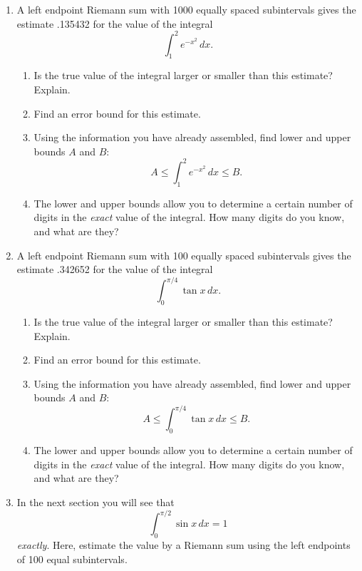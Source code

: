 \begin{enumerate}
\item A left endpoint Riemann sum with 1000 equally spaced subintervals
gives the estimate .135432 for the value of the integral
	\[
\int_1^2 e^{-x^2} \, dx.
\]


  \begin{enumerate}
  \item Is the true value of the integral larger or smaller than this
estimate?  Explain.

  \item Find an error bound for this estimate.

  \item Using the information you have already assembled, find lower and
upper bounds $A$ and $B$:
	\[
A \leq \int_1^2 e^{-x^2} \, dx \leq B.
\]


  \item The lower and upper bounds allow you to determine a certain
number of digits in the {\em exact\/} value of the integral.  How many
digits do you know, and what are they?



\end{enumerate}
\item A left endpoint Riemann sum with 100 equally spaced subintervals
gives the estimate .342652 for the value of the integral
	\[
\int_0^{\pi/4} \tan{x} \, dx.
\]


  \begin{enumerate}
  \item Is the true value of the integral larger or smaller than this
estimate?  Explain.

  \item Find an error bound for this estimate.

  \item Using the information you have already assembled, find lower and
upper bounds $A$ and $B$:
	\[
A \leq \int_0^{\pi/4} \tan{x} \, dx \leq B.
\]


  \item The lower and upper bounds allow you to determine a certain
number of digits in the {\em exact\/} value of the integral.  How many
digits do you know, and what are they?



\end{enumerate}
\item In the next section you will see that
	\[
\int_0^{\pi/2} \sin{x} \, dx = 1
\]
{\em exactly}.  Here, estimate the value by a Riemann sum using the left endpoints of 100 equal subintervals.


\end{enumerate}
